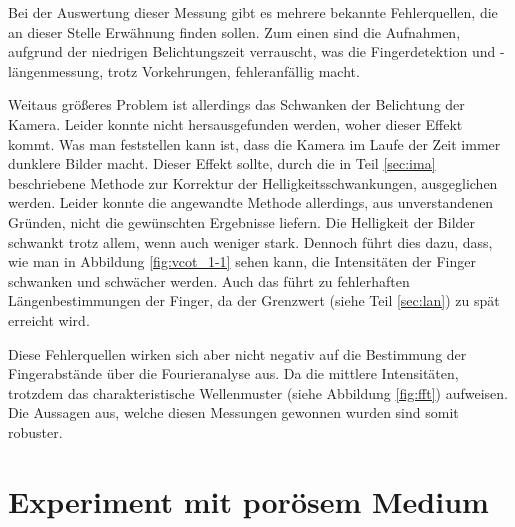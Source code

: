 Bei der Auswertung dieser Messung gibt es mehrere bekannte Fehlerquellen, die an dieser Stelle Erwähnung finden sollen. Zum einen sind die Aufnahmen, aufgrund der niedrigen Belichtungszeit verrauscht, was die Fingerdetektion und -längenmessung, trotz Vorkehrungen, fehleranfällig macht.

Weitaus größeres Problem ist allerdings das Schwanken der Belichtung der Kamera. Leider konnte nicht hersausgefunden werden, woher dieser Effekt kommt. Was man feststellen kann ist, dass die Kamera im Laufe der Zeit immer dunklere Bilder macht. Dieser Effekt sollte, durch die in Teil \ref{sec:ima} beschriebene Methode zur Korrektur der Helligkeitsschwankungen, ausgeglichen werden. Leider konnte die angewandte Methode allerdings, aus unverstandenen Gründen, nicht die gewünschten Ergebnisse liefern. Die Helligkeit der Bilder schwankt trotz allem, wenn auch weniger stark. Dennoch führt dies dazu, dass, wie man in Abbildung \ref{fig:vcot_1-1} sehen kann, die Intensitäten der Finger schwanken und schwächer werden. Auch das führt zu fehlerhaften Längenbestimmungen der Finger, da der Grenzwert (siehe Teil \ref{sec:lan}) zu spät erreicht wird.

Diese Fehlerquellen wirken sich aber nicht negativ auf die Bestimmung der Fingerabstände über die Fourieranalyse aus. Da die mittlere Intensitäten, trotzdem das charakteristische Wellenmuster (siehe Abbildung \ref{fig:fft}) aufweisen. Die Aussagen aus, welche diesen Messungen gewonnen wurden sind somit robuster.



% 
% 


\newpage

\section{\COTm Experiment mit porösem Medium}
\label{res:cpm}

